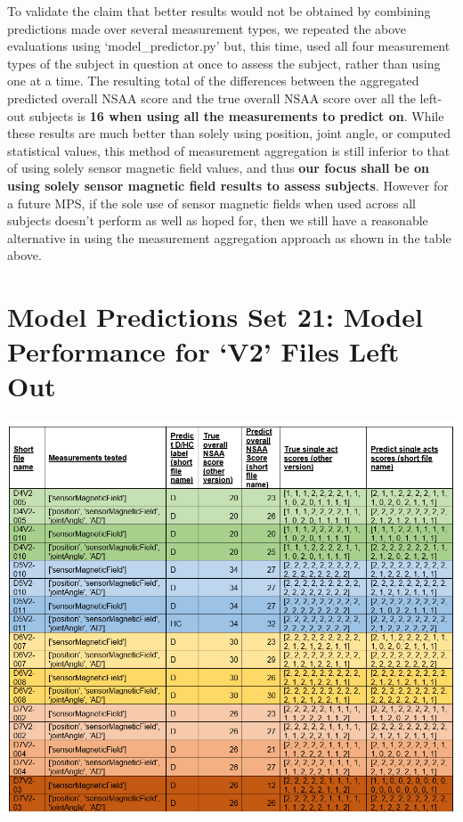 \documentclass[12pt,twoside]{report}
\begin{document}
\quad To validate the claim that better results would not be obtained by combining predictions made over several measurement types, we repeated the above evaluations using ‘model\_predictor.py’ but, this time, used all four measurement types of the subject in question at once to assess the subject, rather than using one at a time. The resulting total of the differences between the aggregated predicted overall NSAA score and the true overall NSAA score over all the left-out subjects is \textbf{16 when using all the measurements to predict on}. While these results are much better than solely using position, joint angle, or computed statistical values, this method of measurement aggregation is still inferior to that of using solely sensor magnetic field values, and thus \textbf{our focus shall be on using solely sensor magnetic field results to assess subjects}. However for a future MPS, if the sole use of sensor magnetic fields when used across all subjects doesn’t perform as well as hoped for, then we still have a reasonable alternative in using the measurement aggregation approach as shown in the table above.




\section{Model Predictions Set 21: Model Performance for ‘V2’ Files Left Out}

\begin{center}
\includegraphics[scale=0.6]{project_figures/fig11_30}
\end{center}
\end{document}
